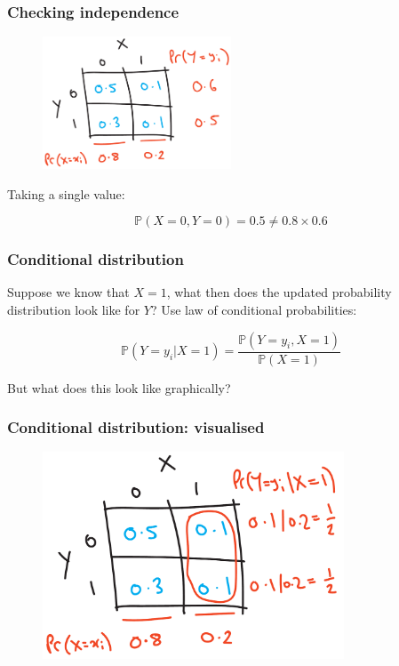 \documentclass{beamer}
\begin{document}
		\begin{frame}
			\frametitle{Checking independence}
			
			\begin{figure}[ht]
				\centerline{\includegraphics[width=0.5\textwidth]{./figures/horse_race_checking_independence.pdf}}
			\end{figure}
			
			Taking a single value:
			
			\begin{equation}
			\mathbb{P}(X=0, Y=0) = 0.5 \neq 0.8 \times 0.6
			\end{equation}
			
		\end{frame}
	
	\begin{frame}
		\frametitle{Conditional distribution}
		
		Suppose we know that $X=1$, what then does the updated probability distribution look like for $Y$? Use law of conditional probabilities:
		
		\begin{equation}
		\mathbb{P}(Y=y_i|X=1) = \frac{\mathbb{P}(Y=y_i,X=1)}{\mathbb{P}(X=1)}
		\end{equation}
		
		But what does this look like graphically?
		
	\end{frame}
	
	\begin{frame}
		\frametitle{Conditional distribution: visualised}
		
		\begin{figure}[ht]
			\centerline{\includegraphics[width=0.8\textwidth]{./figures/horse_race_conditional.pdf}}
		\end{figure}
		
	\end{frame}
	
\end{document}
